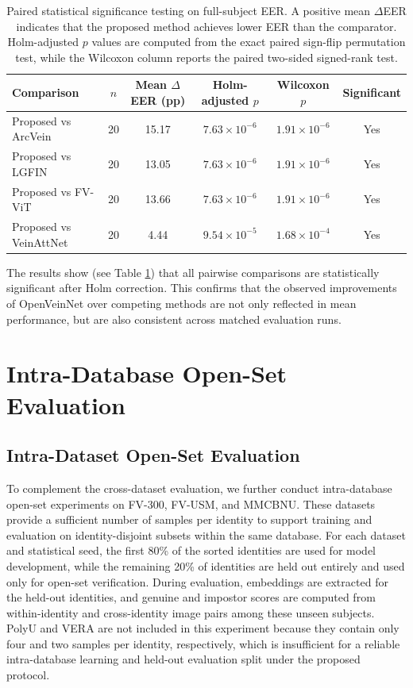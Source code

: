 \documentclass[10pt,journal,compsoc]{IEEEtran}
\begin{document}
\begin{table}[ht!]
    \centering
    \begin{tabular}{|l|c|c|c|c|c|}
        \hline
        Comparison & $n$ & Mean $\Delta$EER (pp) & Holm-adjusted $p$ & Wilcoxon $p$ & Significant \\
        \hline
        Proposed vs ArcVein & 20 & 15.17 & $7.63 \times 10^{-6}$ & $1.91 \times 10^{-6}$ & Yes \\
        Proposed vs LGFIN & 20 & 13.05 & $7.63 \times 10^{-6}$ & $1.91 \times 10^{-6}$ & Yes \\
        Proposed vs FV-ViT & 20 & 13.66 & $7.63 \times 10^{-6}$ & $1.91 \times 10^{-6}$ & Yes \\
        Proposed vs VeinAttNet & 20 & 4.44 & $9.54 \times 10^{-5}$ & $1.68 \times 10^{-4}$ & Yes \\
        \hline
    \end{tabular}
    \caption{Paired statistical significance testing on full-subject EER. A positive mean $\Delta$EER indicates that the proposed method achieves lower EER than the comparator. Holm-adjusted $p$ values are computed from the exact paired sign-flip permutation test, while the Wilcoxon column reports the paired two-sided signed-rank test.}
    \label{tab:statistical_significance}
\end{table}


The results show (see Table \ref{tab:statistical_significance}) that all pairwise comparisons are statistically significant after Holm correction. This confirms that the observed improvements of OpenVeinNet over competing methods are not only reflected in mean performance, but are also consistent across matched evaluation runs.



\section{Intra-Database Open-Set Evaluation}
\label{sec:intra_database_open_set}
\subsection{Intra-Dataset Open-Set Evaluation}




To complement the cross-dataset evaluation, we further conduct intra-database open-set experiments on FV-300, FV-USM, and MMCBNU. These datasets provide a sufficient number of samples per identity to support training and evaluation on identity-disjoint subsets within the same database. For each dataset and statistical seed, the first 80\% of the sorted identities are used for model development, while the remaining 20\% of identities are held out entirely and used only for open-set verification. During evaluation, embeddings are extracted for the held-out identities, and genuine and impostor scores are computed from within-identity and cross-identity image pairs among these unseen subjects. PolyU and VERA are not included in this experiment because they contain only four and two samples per identity, respectively, which is insufficient for a reliable intra-database learning and held-out evaluation split under the proposed protocol.
\end{document}
